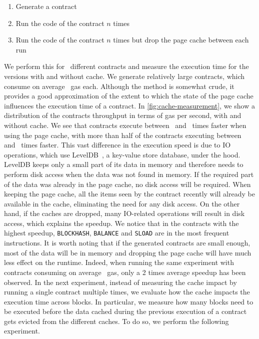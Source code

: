 \begin{enumerate}
	\item Generate a contract
	\item Run the code of the contract $n$ times
	\item Run the code of the contract $n$ times but drop the page cache between each run
\end{enumerate}
%
We perform this for~ different contracts and measure the execution time for the versions with and without cache. We generate relatively large contracts, which consume on average~ gas each.
Although the method is somewhat crude, it provides a good approximation of the extent to which the state of the page cache influences the execution time of a contract.
In \autoref{fig:cache-measurement}, we show a distribution of the contracts throughput in terms of gas per second, with and without cache. We see that contracts execute between~ and~ times faster when using the page cache, with more than half of the contracts executing between~ and~ times faster.
This vast difference in the execution speed is due to IO operations, which use LevelDB~\cite{ghemawat2011leveldb}, a key-value store database, under the hood. LevelDB keeps only a small part of its data in memory and therefore needs to perform disk access when the data was not found in memory.
If the required part of the data was already in the page cache, no disk access will be required.
When keeping the page cache, all the items seen by the contract recently will already be available in the cache, eliminating the need for any disk access. On the other hand, if the caches are dropped, many IO-related operations will result in disk access, which explains the speedup.
We notice that in the contracts with the highest speedup, \lstinline{BLOCKHASH}, \lstinline{BALANCE} and \lstinline{SLOAD} are in the most frequent instructions.
It is worth noting that if the generated contracts are small enough, most of the data will be in memory and dropping the page cache will have much less effect on the runtime.
Indeed, when running the same experiment with contracts consuming on average~ gas, only a 2 times average speedup has been observed.
%
 In the next experiment, instead of measuring the cache impact by running a single contract multiple times, we evaluate how the cache impacts the execution time across blocks. In particular, we measure how many blocks need to be executed before the data cached during the previous execution of a contract gets evicted from the different caches. To do so, we perform the following experiment.

